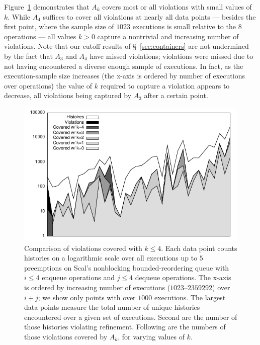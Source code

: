 Figure~\ref{fig:data:coverage} demonstrates that $A_k$ covers most or all
violations with small values of $k$. While $A_4$ suffices to cover all
violations at nearly all data points --- besides the first point, where the
sample size of $1023$ executions is small relative to the $8$ operations ---
all values $k > 0$ capture a nontrivial and increasing number of violations.
Note that our cutoff results of \S~\ref{sec:containers} are not undermined
by the fact that $A_3$ and $A_4$ have missed violations; violations were missed
due to not having encountered a diverse enough sample of executions. In fact,
as the execution-sample size increases (the x-axis is ordered by number of
executions over operations) the value of $k$ required to capture a violation
appears to decrease, all violations being captured by $A_3$ after a certain
point.


\begin{figure}[t]
  \centering
  \includegraphics[width=\linewidth]{figures/coverage-bkq-2-barriers}
  \caption{Comparison of violations covered with
    $k \le 4$. Each data point counts histories on a logarithmic scale over
    all executions up to $5$ preemptions on Scal's nonblocking
    bounded-reordering queue with $i \le 4$ enqueue operations and $j \le 4$
    dequeue operations. The x-axis is ordered by increasing number of
    executions ($1023$--$2359292$) over $i\!+\!j$; we show only points with over
    $1000$ executions. The largest data points measure the total
    number of unique histories encountered over a given set of executions.
    Second are the number of those histories violating refinement.
    Following are the
    numbers of those violations covered by $A_k$, for varying values of $k$.
  }
  \label{fig:data:coverage}
\end{figure}

